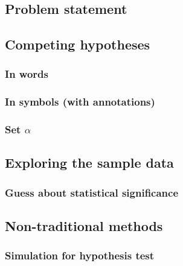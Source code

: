 \documentclass[12pt, krantz2,]{krantz}
\begin{document}
\hypertarget{problem-statement-1}{%
\subsection{Problem statement}\label{problem-statement-1}}

\hypertarget{competing-hypotheses-1}{%
\subsection{Competing hypotheses}\label{competing-hypotheses-1}}

\hypertarget{in-words-1}{%
\subsubsection*{In words}\label{in-words-1}}


\hypertarget{in-symbols-with-annotations-1}{%
\subsubsection*{In symbols (with annotations)}\label{in-symbols-with-annotations-1}}


\hypertarget{set-alpha-1}{%
\subsubsection*{\texorpdfstring{Set \(\alpha\)}{Set \textbackslash{}alpha}}\label{set-alpha-1}}


\hypertarget{exploring-the-sample-data-1}{%
\subsection{Exploring the sample data}\label{exploring-the-sample-data-1}}

\hypertarget{guess-about-statistical-significance-1}{%
\subsubsection*{Guess about statistical significance}\label{guess-about-statistical-significance-1}}


\hypertarget{non-traditional-methods-1}{%
\subsection{Non-traditional methods}\label{non-traditional-methods-1}}

\hypertarget{simulation-for-hypothesis-test}{%
\subsubsection*{Simulation for hypothesis test}\label{simulation-for-hypothesis-test}}
\end{document}
